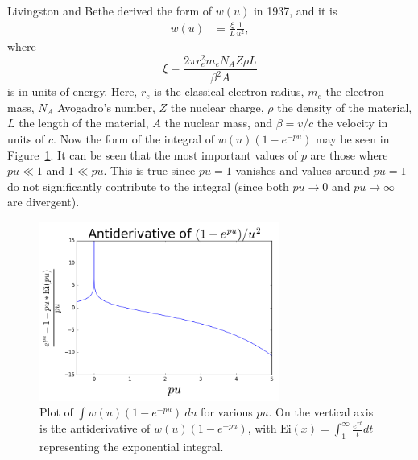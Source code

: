 Livingston and Bethe \cite{livingston} derived the form of $w(u)$ in 1937, and it is
\begin{align*}
w(u)&=\frac{\xi}{L}\frac{1}{u^2},
\end{align*}
where
\begin{equation}\label{eqn:xi_apx}
\xi=\frac{2\pi r_e ^2 m_e N_A Z\rho L}{\beta^2 A}
\end{equation}
is in units of energy. Here, $r_e$ is the classical electron radius, $m_e$ the electron mass, $N_A$ Avogadro's number, $Z$ the nuclear charge, $\rho$ the density of the material, $L$ the length of the material, $A$ the nuclear mass, and $\beta=v/c$ the velocity in units of $c$. Now the form of the integral of $w(u)(1-e^{-pu})$ may be seen in Figure~\ref{fig:landauPUPlot}. It can be seen that the most important values of $p$ are those where $pu \ll 1$ and $1 \ll pu$. This is true since $pu=1$ vanishes and values around $pu=1$ do not significantly contribute to the integral (since both $pu\rightarrow 0$ and $pu\rightarrow\infty$ are divergent).

\begin{figure}[h!]
  \centering
    \includegraphics[width=0.7\textwidth]{Figures/landauPUPlot} 
  \caption[Plot of $\int w(u)(1-e^{-pu})\ du$.]{Plot of $\int w(u)(1-e^{-pu})\ du$ for various $pu$. On the vertical axis is the antiderivative of $w(u)(1-e^{-pu})$, with $\text{Ei}(x)=\int_1 ^\infty \frac{e^{xt}}{t}dt$ representing the exponential integral.}
  \label{fig:landauPUPlot}
\end{figure}


